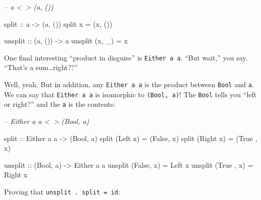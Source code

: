 \documentclass[]{article}
\newenvironment{Shaded}{}{}
\newcommand{\CommentTok}[1]{\textcolor[rgb]{0.38,0.63,0.69}{\textit{#1}}}
\newcommand{\DataTypeTok}[1]{\textcolor[rgb]{0.56,0.13,0.00}{#1}}
\newcommand{\FunctionTok}[1]{\textcolor[rgb]{0.02,0.16,0.49}{#1}}
\newcommand{\NormalTok}[1]{#1}
\newcommand{\OtherTok}[1]{\textcolor[rgb]{0.00,0.44,0.13}{#1}}
\begin{document}
\begin{Shaded}
\begin{Highlighting}[]
\CommentTok{-- a <~> (a, ())}

\OtherTok{split ::}\NormalTok{ a }\OtherTok{->}\NormalTok{ (a, ())}
\NormalTok{split x }\FunctionTok{=}\NormalTok{ (x, ())}

\OtherTok{unsplit ::}\NormalTok{ (a, ()) }\OtherTok{->}\NormalTok{ a}
\NormalTok{unsplit (x, _) }\FunctionTok{=}\NormalTok{ x}
\end{Highlighting}
\end{Shaded}

One final interesting ``product in disguise'' is \texttt{Either\ a\ a}. ``But
wait,'' you say. ``That's a sum\ldots{}right??''

Well, yeah. But in addition, any \texttt{Either\ a\ a} is the product between
\texttt{Bool} and \texttt{a}. We can say that \texttt{Either\ a\ a} is
isomorphic to \texttt{(Bool,\ a)}! The \texttt{Bool} tells you ``left or
right?'' and the \texttt{a} is the contents:

\begin{Shaded}
\begin{Highlighting}[]
\CommentTok{-- Either a a <~> (Bool, a)}

\OtherTok{split ::} \DataTypeTok{Either}\NormalTok{ a a }\OtherTok{->}\NormalTok{ (}\DataTypeTok{Bool}\NormalTok{, a)}
\NormalTok{split (}\DataTypeTok{Left}\NormalTok{  x) }\FunctionTok{=}\NormalTok{ (}\DataTypeTok{False}\NormalTok{, x)}
\NormalTok{split (}\DataTypeTok{Right}\NormalTok{ x) }\FunctionTok{=}\NormalTok{ (}\DataTypeTok{True}\NormalTok{ , x)}

\OtherTok{unsplit ::}\NormalTok{ (}\DataTypeTok{Bool}\NormalTok{, a) }\OtherTok{->} \DataTypeTok{Either}\NormalTok{ a a}
\NormalTok{unsplit (}\DataTypeTok{False}\NormalTok{, x) }\FunctionTok{=} \DataTypeTok{Left}\NormalTok{  x}
\NormalTok{unsplit (}\DataTypeTok{True}\NormalTok{ , x) }\FunctionTok{=} \DataTypeTok{Right}\NormalTok{ x}
\end{Highlighting}
\end{Shaded}

Proving that \texttt{unsplit\ .\ split\ =\ id}:
\end{document}
